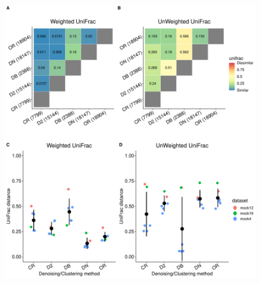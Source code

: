 \documentclass[letterpaper,12pt]{article}
\providecommand{\DIFdelend}{} %
\providecommand{\DIFaddbeginFL}{} %
\providecommand{\DIFaddendFL}{} %
\providecommand{\DIFdelbeginFL}{} %
\providecommand{\DIFdelendFL}{} %
\newcommand{\DIFscaledelfig}{0.5}
\newlength{\DIFdelgraphicswidth} %
\newlength{\DIFdelgraphicsheight} %
\newcommand{\DIFaddincludegraphics}[2][]{{\color{blue}\fbox{\DIFOincludegraphics[#1]{#2}}}} %
\newcommand{\DIFdelincludegraphics}[2][]{%
\sbox{\DIFdelgraphicsbox}{\DIFOincludegraphics[#1]{#2}}%
\settoboxwidth{\DIFdelgraphicswidth}{\DIFdelgraphicsbox} %
\settoboxtotalheight{\DIFdelgraphicsheight}{\DIFdelgraphicsbox} %
\scalebox{\DIFscaledelfig}{%
\parbox[b]{\DIFdelgraphicswidth}{\usebox{\DIFdelgraphicsbox}\\[-\baselineskip] \rule{\DIFdelgraphicswidth}{0em}}\llap{\resizebox{\DIFdelgraphicswidth}{\DIFdelgraphicsheight}{%
\setlength{\unitlength}{\DIFdelgraphicswidth}%
\begin{picture}(1,1)%
\thicklines\linethickness{2pt} %
{\color[rgb]{1,0,0}\put(0,0){\framebox(1,1){}}}%
{\color[rgb]{1,0,0}\put(0,0){\line( 1,1){1}}}%
{\color[rgb]{1,0,0}\put(0,1){\line(1,-1){1}}}%
\end{picture}%
}\hspace*{3pt}}} %
} %
\DeclareRobustCommand{\DIFdelend}{\DIFOaddend \let\includegraphics\DIFOincludegraphics} %
\DeclareRobustCommand{\DIFaddbeginFL}{\DIFOaddbeginFL \let\includegraphics\DIFaddincludegraphics} %
\DeclareRobustCommand{\DIFaddendFL}{\DIFOaddendFL \let\includegraphics\DIFOincludegraphics} %
\DeclareRobustCommand{\DIFdelbeginFL}{\DIFOdelbeginFL \let\includegraphics\DIFdelincludegraphics} %
\DeclareRobustCommand{\DIFdelendFL}{\DIFOaddendFL \let\includegraphics\DIFOincludegraphics} %
\begin{document}
\DIFdelend \begin{figure}[H]
    \centering
    \DIFdelbeginFL %
\DIFdelendFL \DIFaddbeginFL \includegraphics[width=\textwidth]{figure2.pdf}
  \DIFaddendFL \end{figure}
\end{document}
